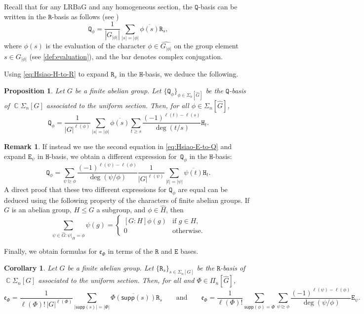\documentclass[11pt, oneside, reqno]{amsart}
\newtheorem{prop}[theorem]{Proposition}
\newtheorem{cor}[theorem]{Corollary}
\theoremstyle{definition}
\newtheorem{remark}[theorem]{Remark}
\numberwithin{equation}{section}
\DeclareMathOperator{\C}{\mathbb{C}}
\def \kk{\C}
\def \ol{\overline}
\def \ee{{\mathfrak{e}}}
\def \wh{\widehat}
\def \gsetcomposition{{\Sigma_n[G]}}
\def \hsiao {{\gsetcomposition}}
\DeclareMathOperator{\chgeq}{\unrhd}
\def\qqand{\qquad\text{and}\qquad}
\def \supp{\mathsf{supp}}
\newcommand{\B}[1]{\mathtt{#1}} 			%
\newcommand{\abs}[1]{|{#1}|} 				%
\begin{document}
Recall that for any LRBaG and any homogeneous section, the $\B{Q}$-basis can be written in the $\B{R}$-basis as follows (see )
\[
    \B{Q}_\phi = 
            \dfrac{1}{|G_{\abs{\phi}}|} \sum_{\abs{s} = \abs{\phi}} \ol{\phi(s)} \B{R}_s,
\]
where $\phi(s)$ is the evaluation of the character $\phi \in \wh{G_{\abs{\phi}}}$ on the group element $s \in G_{\abs{\phi}}$ (see \cref{def:evaluation}), and the bar denotes complex conjugation.

Using \cref{eq:Hsiao-H-to-R} to expand $\B{R}_s$ in the $\B{H}$-basis, we deduce the following.

\begin{prop}
    Let $G$ be a finite abelian group. Let $\{\B{Q}_\phi\}_{\phi \in \Sigma_n[\wh{G}]}$ be the $\B{Q}$-basis of $\kk \hsiao$ associated to the uniform section.
    Then, for all $\phi \in \Sigma_n[\wh{G}]$,
    \begin{equation}\label{eq:Hsiao-H-to-Q}
        \B{Q}_\phi =
            \dfrac{1}{|G|^{\ell(\phi)}} \sum_{\abs{s} = \abs{\phi}} \ol{\phi(s)} \sum_{t \geq s} \dfrac{(-1)^{\ell(t)-\ell(s)}}{\deg(t/s)} \B{H}_t.
    \end{equation}
\end{prop}

\begin{remark}
    If instead we use the second equation in \cref{eq:Hsiao-E-to-Q} and expand $\B{E}_\psi$ in $\B{H}$-basis, we obtain a different expression for~$\B{Q}_\phi$ in the $\B{H}$-basis:
    \[
        \B{Q}_\phi = \sum_{\psi \chgeq \phi} \dfrac{(-1)^{\ell(\psi) - \ell(\phi)}}{\deg(\psi/\phi)} \dfrac{1}{|G|^{\ell(\psi)}} \sum_{\abs{t} = \abs{\psi}} \ol{\psi(t)} \B{H}_t.
    \]
    A direct proof that these two different expressions for $\B{Q}_\phi$ are equal can be deduced using the following property of the characters of finite abelian groups.
    If $G$ is an abelian group, $H \leq G$ a subgroup, and $\phi \in \wh{H}$, then
    \[
        \sum_{\psi \in \wh{G} : \psi|_H = \phi} \psi(g) =
        \begin{cases}
            [G:H] \phi(g)      & \text{if } g \in H,\\
            0                           & \text{otherwise.}
        \end{cases}
    \]
\end{remark}

Finally, we obtain formulas for $\ee_\Phi$ in terms of the $\B{R}$ and $\B{E}$ bases. 
\begin{cor}
    Let $G$ be a finite abelian group. Let $\{\B{R}_s\}_{s \in \hsiao}$ be the $\B{R}$-basis of $\kk \hsiao$ associated to the uniform section.
    Then, for all and $\Phi \in \Pi_n[\wh{G}]$,
    \[
        \ee_\Phi = 
            \dfrac{1}{\ell(\Phi)! \, |G|^{\ell(\Phi)}} \sum_{\abs{\supp(s)} = \abs{\Phi}} \ol{\Phi(\supp(s))} \B{R}_s
        \qqand
        \ee_\Phi = 
            \dfrac{1}{\ell(\Phi)!} \sum_{\supp(\phi) = \Phi} \sum_{\psi \chgeq \phi} \dfrac{(-1)^{\ell(\psi) - \ell(\phi)}}{\deg(\psi/\phi)} \B{E}_\psi.
    \]
\end{cor}
\end{document}
